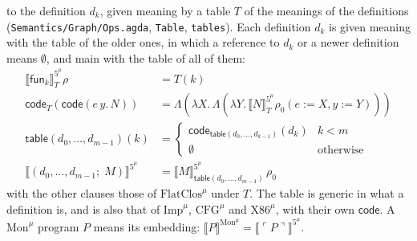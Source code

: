 \documentclass[10pt]{article}
\theoremstyle{acmplain}
\newcommand{\SEM}[1]{\llbracket #1 \rrbracket}
\newcommand{\key}[1]{\mathsf{#1}}
\newcommand{\funref}[1]{\key{fun}_{#1}}
\newcommand{\Tcodetm}[3]{\key{code}(#1\,#2.\,#3)}  %
\newcommand{\Tembed}[1]{\ulcorner #1 \urcorner}  %
\newcommand{\Ml}[1]{\textrm{#1}^{\mu}}                  %
\begin{document}
to the definition $d_k$, given meaning by a table $T$ of the meanings of
the definitions (\texttt{Semantics/Graph/Ops.agda}, \texttt{Table},
\texttt{tables}). Each definition $d_k$ is given meaning with the table of
the older ones, in which a reference to $d_k$ or a newer definition means
$\emptyset$, and main with the table of all of them:
\begin{align*}
  \SEM{\funref{k}}^{\Ml{5}}_T\rho &= T(k) \\
  \key{code}_T(\Tcodetm{e}{y}{N}) &= \Lambda(\lambda X.\, \Lambda(\lambda Y.\, \SEM{N}^{\Ml{5}}_T\rho_0(e{:=}X, y{:=}Y))) \\
  \key{table}(d_0,\ldots,d_{m-1})(k) &=
    \begin{cases}
      \key{code}_{\key{table}(d_0,\ldots,d_{k-1})}(d_k) & k < m \\
      \emptyset & \text{otherwise}
    \end{cases} \\
  \SEM{(d_0, \ldots, d_{m-1};\; M)}^{\Ml{5}} &= \SEM{M}^{\Ml{5}}_{\key{table}(d_0,\ldots,d_{m-1})}\,\rho_0
\end{align*}
with the other clauses those of $\Ml{FlatClos}$ under $T$. The table is
generic in what a definition is, and is also that of $\Ml{Imp}$, $\Ml{CFG}$
and $\Ml{X86}$, with their own $\key{code}$. A $\Ml{Mon}$ program $P$ means
its embedding: $\SEM{P}^{\Ml{Mon}} = \SEM{\Tembed{P}}^{\Ml{5}}$.
\end{document}
